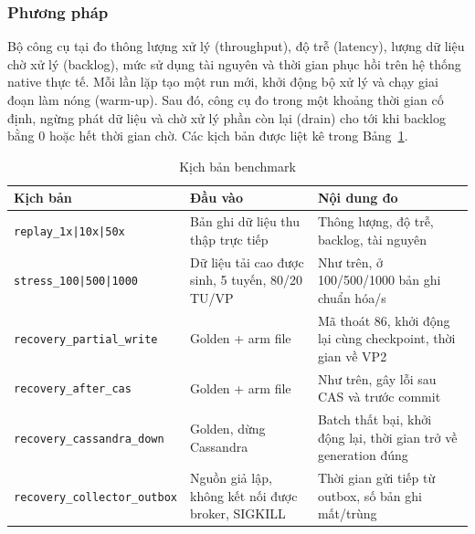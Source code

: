 \subsubsection{Phương pháp}

Bộ công cụ tại  đo thông lượng xử lý (throughput), độ trễ (latency), lượng dữ liệu chờ xử lý (backlog), mức sử dụng tài nguyên và thời gian phục hồi trên hệ thống native thực tế. Mỗi lần lặp tạo một run mới, khởi động bộ xử lý và chạy giai đoạn làm nóng (warm-up). Sau đó, công cụ đo trong một khoảng thời gian cố định, ngừng phát dữ liệu và chờ xử lý phần còn lại (drain) cho tới khi backlog bằng 0 hoặc hết thời gian chờ. Các kịch bản được liệt kê trong Bảng~\ref{tab:bench}.

\begin{table}[H]
\centering
\tablefont
\caption{Kịch bản benchmark}
\label{tab:bench}
\begin{tabular}{p{4.46cm}p{5.04cm}p{5.63cm}}
\toprule
\textbf{Kịch bản} & \textbf{Đầu vào} & \textbf{Nội dung đo} \\
\midrule
\texttt{replay\_1x|10x|50x} & Bản ghi dữ liệu thu thập trực tiếp & Thông lượng, độ trễ, backlog, tài nguyên \\
\texttt{stress\_100|500|1000} & Dữ liệu tải cao được sinh, 5 tuyến, 80/20 TU/VP & Như trên, ở 100/500/1000 bản ghi chuẩn hóa/s \\
\texttt{recovery\_partial\_write} & Golden + arm file & Mã thoát 86, khởi động lại cùng checkpoint, thời gian về VP2 \\
\texttt{recovery\_after\_cas} & Golden + arm file & Như trên, gây lỗi sau CAS và trước commit \\
\texttt{recovery\_cassandra\_down} & Golden, dừng Cassandra & Batch thất bại, khởi động lại, thời gian trở về generation đúng \\
\texttt{recovery\_collector\_outbox} & Nguồn giả lập, không kết nối được broker, SIGKILL & Thời gian gửi tiếp từ outbox, số bản ghi mất/trùng \\
\bottomrule
\end{tabular}
\end{table}


